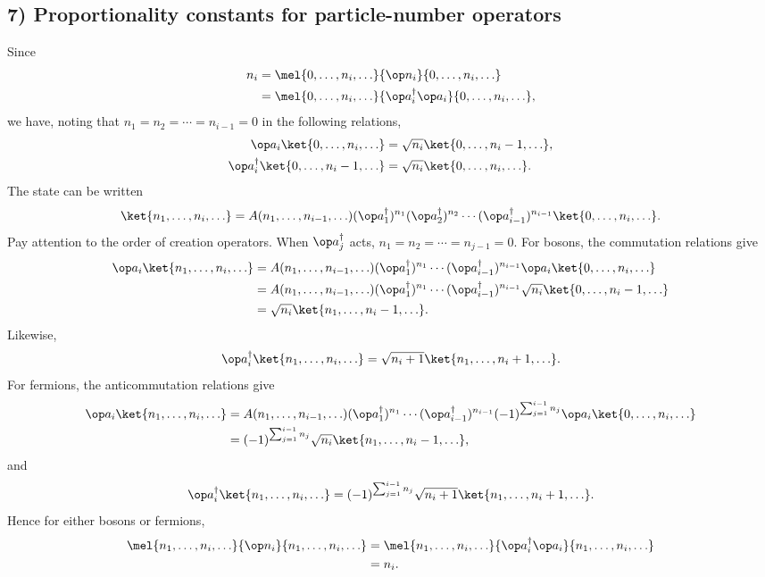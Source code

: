 \subsection*{7) Proportionality constants for particle-number operators}
Since
\begin{align*}
n_i
&=\mel{0,\ldots,n_i,\ldots}{\op n_i}{0,\ldots,n_i,\ldots}\\
&=\mel{0,\ldots,n_i,\ldots}{\op a_i^\dagger\op a_i}{0,\ldots,n_i,\ldots},
\end{align*}
we have, noting that $n_1=n_2=\cdots=n_{i-1}=0$ in the following relations,
\begin{align*}
\op a_i\ket{0,\ldots,n_i,\ldots}
&=\sqrt{n_i}\ket{0,\ldots,n_i-1,\ldots},\\
\op a_i^\dagger\ket{0,\ldots,n_i-1,\ldots}
&=\sqrt{n_i}\ket{0,\ldots,n_i,\ldots}.
\end{align*}
The state can be written
\[
\ket{n_1,\ldots,n_i,\ldots}
=A(n_1,\ldots,n_{i-1},\ldots)
(\op a_1^\dagger)^{n_1}(\op a_2^\dagger)^{n_2}\cdots
(\op a_{i-1}^\dagger)^{n_{i-1}}
\ket{0,\ldots,n_i,\ldots}.
\]
Pay attention to the order of creation operators. When $\op a_j^\dagger$ acts, $n_1=n_2=\cdots=n_{j-1}=0$. For bosons, the commutation relations give
\begin{align*}
\op a_i\ket{n_1,\ldots,n_i,\ldots}
&=A(n_1,\ldots,n_{i-1},\ldots)
(\op a_1^\dagger)^{n_1}\cdots
(\op a_{i-1}^\dagger)^{n_{i-1}}
\op a_i\ket{0,\ldots,n_i,\ldots}\\
&=A(n_1,\ldots,n_{i-1},\ldots)
(\op a_1^\dagger)^{n_1}\cdots
(\op a_{i-1}^\dagger)^{n_{i-1}}
\sqrt{n_i}\ket{0,\ldots,n_i-1,\ldots}\\
&=\sqrt{n_i}\ket{n_1,\ldots,n_i-1,\ldots}.
\end{align*}
Likewise,
\[\op a_i^\dagger\ket{n_1,\ldots,n_i,\ldots}
=\sqrt{n_i+1}\ket{n_1,\ldots,n_i+1,\ldots}.\]
For fermions, the anticommutation relations give
\begin{align*}
\op a_i\ket{n_1,\ldots,n_i,\ldots}
&=A(n_1,\ldots,n_{i-1},\ldots)
(\op a_1^\dagger)^{n_1}\cdots
(\op a_{i-1}^\dagger)^{n_{i-1}}
(-1)^{\sum_{j=1}^{i-1}n_j}
\op a_i\ket{0,\ldots,n_i,\ldots}\\
&=(-1)^{\sum_{j=1}^{i-1}n_j}\sqrt{n_i}
\ket{n_1,\ldots,n_i-1,\ldots},
\end{align*}
and
\[\op a_i^\dagger\ket{n_1,\ldots,n_i,\ldots}
=(-1)^{\sum_{j=1}^{i-1}n_j}\sqrt{n_i+1}
\ket{n_1,\ldots,n_i+1,\ldots}.\]
Hence for either bosons or fermions,
\begin{align*}
\mel{n_1,\ldots,n_i,\ldots}{\op n_i}{n_1,\ldots,n_i,\ldots}
&=\mel{n_1,\ldots,n_i,\ldots}{\op a_i^\dagger\op a_i}{n_1,\ldots,n_i,\ldots}\\
&=n_i.
\end{align*}